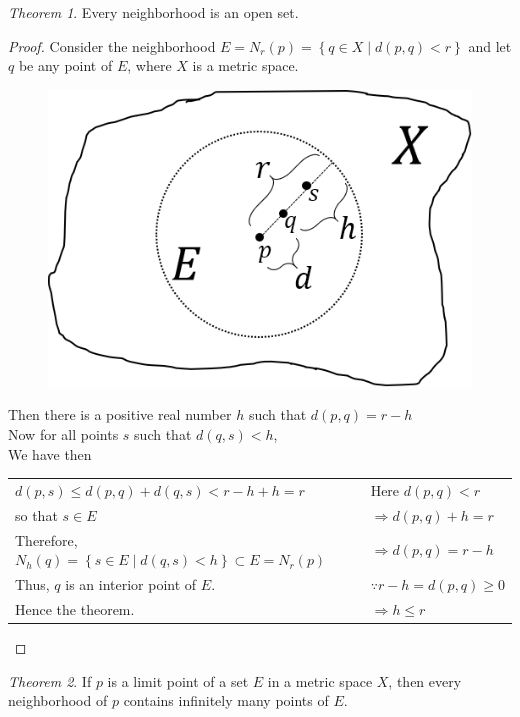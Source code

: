 \documentclass[12pt,oneside,a4paper]{book}
\newcommand{\set}[1]{\left\{#1\right\}}
\theoremstyle{remark}
\newtheorem{thm}{Theorem}[section]
\theoremstyle{definition}
\begin{document}
\begin{thm}
    Every neighborhood is an open set.
\end{thm}
\begin{proof}
    Consider the neighborhood $ E=N_r(p)=\set{q\in X\mid d(p,q)<r} $ and let $ q $ be any point of $ E $, where $ X $ is a metric space.
    \begin{figure}[H]
        \centering
        \includegraphics[scale=.75]{Picture1.png}
        \label{fig:thmNHDopen}
    \end{figure}
    Then there is a positive real number $ h $ such that $ d(p,q)=r-h $\\
    Now for all points $ s $ such that $ d(q,s)<h $,\\
    We have then\\
    \begin{tabular}{p{10cm} | l}
        $ d(p,s)\leq d(p,q)+d(q,s)<r-h+h=r $& Here $ d(p,q)<r $\\
        so that $ s\in E $ & $ \Rightarrow d(p,q)+h=r $\\
        Therefore, $ N_h(q)=\set{s\in E\mid d(q,s)<h}\subset E=N_r(p) $  & $ \Rightarrow d(p,q)=r-h $\\ 
        \cline{2-2} Thus, $ q $ is an interior point of $ E $.& $ \because r-h=d(p,q)\geq 0 $\\
        Hence the theorem. &$ \Rightarrow h\leq r $    
    \end{tabular}
    \space \qedhere
\end{proof}
\begin{thm}
    If $ p $ is a limit point of a set $ E $ in a metric space $ X $, then every neighborhood of $ p $ contains infinitely many points of $ E $.
\end{thm}
\end{document}
